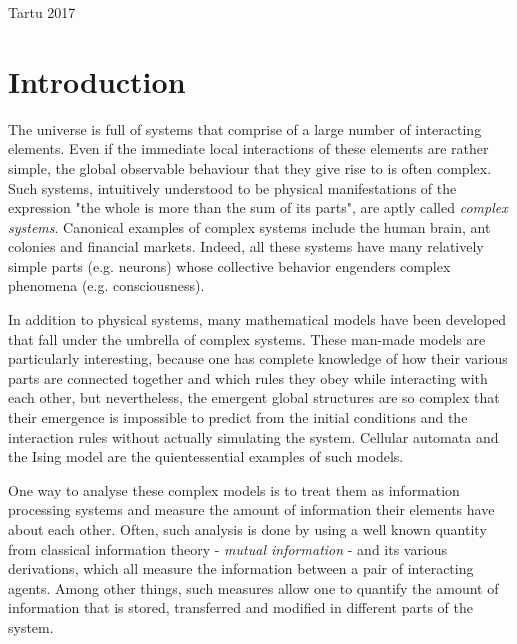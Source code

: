 \documentclass[12pt]{article}
\begin{document}
\vfill
\centerline{Tartu 2017}



\newpage
\tableofcontents

\newpage
\section*{Introduction}



The universe is full of systems that comprise of a large number of interacting elements. Even if the immediate local interactions of these elements are rather simple, the global observable behaviour that they give rise to is often complex. Such systems, intuitively understood to be physical manifestations of the expression "the whole is more than the sum of its parts", are aptly called \textit{complex systems}. Canonical examples of complex systems include the human brain, ant colonies and financial markets. Indeed, all these systems have many relatively simple parts (e.g. neurons) whose collective behavior engenders complex phenomena (e.g. consciousness). 

In addition to physical systems, many mathematical models have been developed that fall under the umbrella of complex systems. These man-made models are particularly interesting, because one has complete knowledge of how their various parts are connected together and which rules they obey while interacting with each other, but nevertheless, the emergent global structures are so complex that their emergence is impossible to predict from the initial conditions and the interaction rules without actually simulating the system.  Cellular automata and the Ising model are the quientessential examples of such models.

One way to analyse these complex models is to treat them as information processing systems and measure the amount of information their elements have about each other. Often, such analysis is done by using a well known quantity from classical information theory - \textit{mutual information} - and its various derivations, which all measure the information between a pair of interacting agents. Among other things, such measures allow one to quantify the amount of information that is stored, transferred and modified in different parts of the system. 
\end{document}

